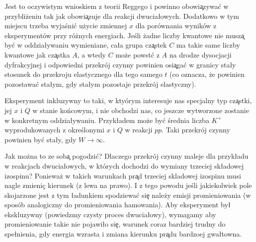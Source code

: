 Jest to oczywistym wnioskiem z teorii Reggego i powinno obowi\c{a}zywa\'{c} w przybli\.{z}eniu
tak jak obowi\c{a}zuje dla reakcji dwucia\l owych. Dodatkowo w tym miejscu trzeba wyja\'{s}ni\'{c}
u\.{z}ycie zmiennej $x$ dla por\'{o}wnania wynik\'{o}w z eksperyment\'{o}w przy r\'{o}\.{z}nych
energiach. Je\'{s}li \.{z}adne liczby kwantowe nie musz\c{a} by\'{c} w oddzia\l ywaniu
wymieniane, ca\l a grupa cz\c{a}stek $C$ ma takie same liczby kwantowe jak cz\c{a}stka $A$,
a wtedy $C$ mo\.{z}e powst\'{c} z $A$ na drodze dysocjacji dyfrakcyjnej i odpowiedni
przekr\'{o}j czynny powinien osi\c{a}ga\'{c} w granicy sta\l y stosunek do
przekroju elastycznego dla tego samego $t$ (co oznacza, \.{z}e powinien pozostawa\'{c} sta\l ym,
gdy sta\l ym pozostaje przekr\'{o}j elastyczny).

Eksperyment inkluzywny to taki, w kty\'{o}rym interesuje nas specjalny typ cz\c{a}stki,
jej $x$ i $Q$ w stanie ko\'{n}cowym, i nie obchodzi nas, co jeszcze wytworzone zostanie w
konkretnym oddzia\l ywaniu. Przyk\l adem mo\.{z}e by\'{c} \'{s}rednia liczba $K^+$
wyprodukowanych z okre\'{s}lonymi $x$ i $Q$ w reakcji $pp$. Taki przekr\'{o}j czynny powinien
by\'{c} sta\l y, gdy $W \rightarrow \infty$.

Jak mo\.{z}na to ze sob\c{a} pogodzi\'{c}?  Dlaczego przekr\'{o}j czynny maleje dla przyk\l adu
w reakcjach dwucia\l owych, w kt\'{o}rych dochodzi do wymiany
trzeciej sk\l adowej izospinu? Poniewa\.{z} w takich warunkach pr\c{a}d trzeciej
skladowej izospinu musi nagle zmieni\c{c} kierunek (z lewa na prawo). I z tego powodu je\'{s}li
jakiekolwiek pole skojarzone jest z tym \l adunkiem spodziewa\'{c} si\c{e} nale\.{z}y
emisji promieniowania (w spos\'{o}b analogiczny do promieniowania hamowania).
Aby eksperyment by{\l } ekskluzywny (powiedzmy czysty proces dwucia\l owy),
wymagamy aby promieniowanie takie nie pojawi\l o si\c{e}, warunek coraz bardziej trudny
do spe\l nienia, gdy energia wzrasta i zmiana kierunku pr\c{a}du bardzoej gwa\l towna.

